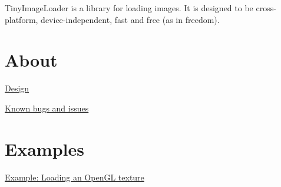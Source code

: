 TinyImageLoader is a library for loading images. It is designed to be cross-\/ platform, device-\/independent, fast and free (as in freedom).\hypertarget{index_About}{}\section{About}\label{index_About}

\begin{DoxyEnumerate}
\item \hyperlink{design}{Design}
\item \hyperlink{bugs}{Known bugs and issues} 
\end{DoxyEnumerate}\hypertarget{index_Examples}{}\section{Examples}\label{index_Examples}

\begin{DoxyEnumerate}
\item \hyperlink{example1}{Example: Loading an OpenGL texture} 
\end{DoxyEnumerate}